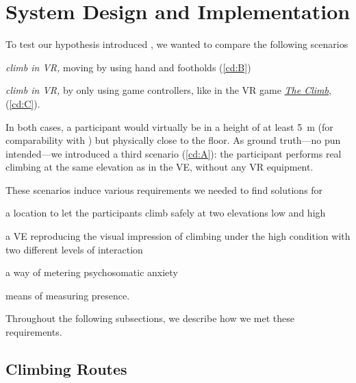 \section{System Design and Implementation}
\label{sec:impl}

To test our hypothesis introduced , we wanted to compare the following scenarios
\begin{inlinelist}
	\item \textit{climb in \gls{VR},} moving by using hand and footholds (\ref{cd:B})
	\item \textit{climb in \gls{VR},} by only using game controllers, like in the \gls{VR} game \href{https://en.wikipedia.org/wiki/The_Climb_(video_game)}{\textit{The Climb}, \citeyear{ClimbOfficialSite2016}} (\ref{cd:C}).
\end{inlinelist} In both cases, a participant would virtually be in a height of at least \SI{5}{\meter} (for comparability with \textcite{Pijpers2006}) but physically close to the floor. As ground truth---no pun intended---we introduced a third scenario (\ref{cd:A}): the participant performs real climbing at the same elevation as in the \gls{VE}, without any \gls{VR} equipment. 

These scenarios induce various requirements we needed to find solutions for
\begin{inlinelist}
	\item a location to let the participants climb safely at two elevations low and high
	\item a \gls{VE} reproducing the visual impression of climbing under the high condition with two different levels of interaction
	\item a way of metering psychosomatic anxiety
	\item means of measuring presence. 
\end{inlinelist} Throughout the following subsections, we describe how we met these requirements.

\subsection{Climbing Routes}

